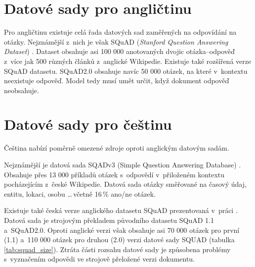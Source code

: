 \section{Datové sady pro angličtinu}
Pro angličtinu existuje celá řada datových sad zaměřených na odpovídání na otázky. Nejznámější z~nich je však SQuAD (\emph{Stanford Question Answering Dataset}) \cite{squad}. Dataset obsahuje asi 100 000 anotovaných dvojic otázka--odpověď z~více jak 500 různých článků z~anglické Wikipedie. Existuje také rozšířená verze SQuAD datasetu. SQuAD2.0 \cite{squad_v2} obsahuje navíc 50 000 otázek, na které v~kontextu neexistuje odpověď. Model tedy musí umět určit, když dokument odpověď neobsahuje.

\section{Datové sady pro češtinu}
Čeština nabízí poměrně omezené zdroje oproti anglickým datovým sadám.\par 
Nejznámější je datová sada SQADv3 (Simple Question Answering Database) \cite{sqad}. Obsahuje přes 13 000 příkladů otázek s~odpovědí v~přiloženém kontextu pocházejícím z~české Wikipedie. Datová sada otázky směřované na časový údaj, entitu, lokaci, osobu \dots \,včetně 16\,\% ano/ne otázek.\par
Existuje také česká verze anglického datasetu SQuAD prezentovaná v~práci \cite{czech_squad}. Datová sada je strojovým překladem původního datasetu SQuAD 1.1 a~SQuAD2.0. Oproti anglické verzi však obsahuje asi 70 000 otázek pro první (1.1) a~110 000 otázek pro druhou (2.0) verzi datové sady SQUAD (tabulka \ref{tab:squad_size}). Ztráta části rozsahu datové sady je způsobena problémy s~vyznačením odpovědi ve strojově přeložené verzi dokumentu.

